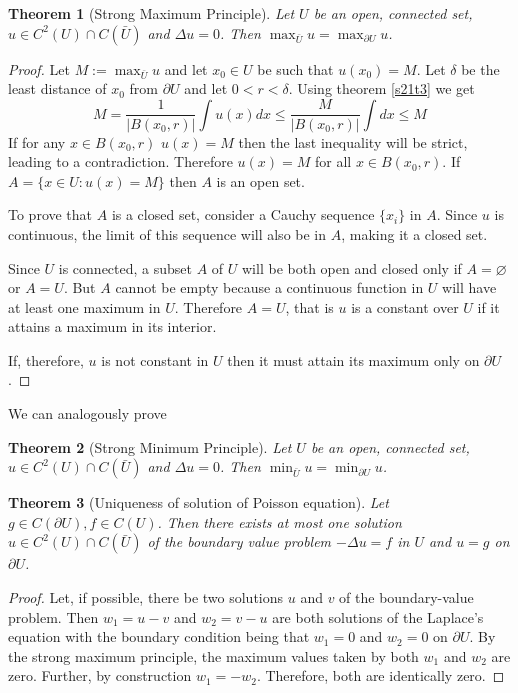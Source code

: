 \documentclass{article}
\theoremstyle{plain}
\newtheorem{thm}{Theorem}
\numberwithin{thm}{section}
\theoremstyle{plain}
\numberwithin{prop}{section}
\theoremstyle{definition}
\numberwithin{defn}{section}
\theoremstyle{remark}
\numberwithin{equation}{section}
\begin{document}
\begin{thm}[Strong Maximum Principle]\label{s21t5}
Let $U$ be an open, connected set, $u \in C^2(U) \cap C(\bar{U})$ and $\Delta u = 0$. Then 
$\max_{\bar{U}}u = \max_{\partial U}u$.
\end{thm}
\begin{proof}
Let $M := \max_{\bar{U}}u$ and let $x_0 \in U$ be such that $u(x_0) = M$. Let $\delta$ be the least 
distance of $x_0$ from $\partial U$ and let $0 < r < \delta$. Using theorem \ref{s21t3} we get
\[
M = \frac{1}{|B(x_0,r)|}\int u(x)dx \le \frac{M}{|B(x_0,r)|}\int dx \le M
\]
If for any $x \in B(x_0,r)$ $u(x) = M$ then the last inequality will be strict, leading to a contradiction. 
Therefore $u(x) = M$ for all $x \in B(x_0,r)$. If $A = \{x \in U : u(x) = M\}$ then $A$ is an open set.

To prove that $A$ is a closed set, consider a Cauchy sequence $\{x_i\}$ in $A$. Since $u$ is continuous, the limit
of this sequence will also be in $A$, making it a closed set.

Since $U$ is connected, a subset $A$ of $U$ will be both open and closed only if $A = \varnothing$ or 
$A = U$. But $A$ cannot be empty because a continuous function in $U$ will have at least one maximum
in $U$. Therefore $A = U$, that is $u$ is a constant over $U$ if it attains a maximum in its 
interior.

If, therefore, $u$ is not constant in $U$ then it must attain its maximum only on $\partial U$.
\end{proof}

We can analogously prove
\begin{thm}[Strong Minimum Principle]\label{s21t6}
Let $U$ be an open, connected set, $u \in C^2(U) \cap C(\bar{U})$ and $\Delta u = 0$. Then 
$\min_{\bar{U}}u = \min_{\partial U}u$.
\end{thm}

\begin{thm}[Uniqueness of solution of Poisson equation]\label{s21t7}
Let $g \in C(\partial U), f \in C(U)$. Then there exists at most one solution $u \in C^2(U)\cap 
C(\bar{U})$ of the boundary value problem $-\Delta u = f$ in $U$ and $u = g$ on $\partial U$.
\end{thm}
\begin{proof}
Let, if possible, there be two solutions $u$ and $v$ of the boundary-value problem. Then $w_1 = u - v$ and $w_2 =
v - u$ are both solutions of the Laplace's equation with the boundary condition being that $w_1 = 0$ and $w_2 = 0$
on $\partial U$. By the strong maximum principle, the maximum values taken by both $w_1$ and $w_2$ are zero.
Further, by construction $w_1 = -w_2$. Therefore, both are identically zero.
\end{proof}
\end{document}
